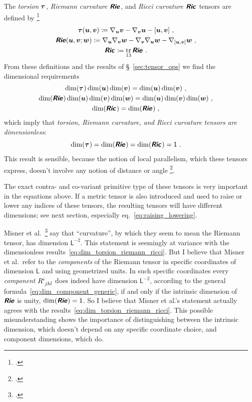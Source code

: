 \documentclass[\ifafour a4paper,12pt,\else a5paper,10pt,\fi%
onecolumn,oneside,article,%
british%
]{memoir}
\makeatletter
\theoremstyle{remark}
\theoremstyle{innote}
\newcommand*{\mathte}[1]{\textbf{\textit{\textsf{#1}}}}
\newcommand*{\citep}{\footcites}
\DeclareMathOperator{\tr}{tr}%
\newcommand*{\defd}{\coloneqq}
\DeclarePairedDelimiter\clcl{[}{]}
\renewcommand*{\|}[1][]{\nonscript\,#1\vert\nonscript\;\mathopen{}}
\newcommand*{\sect}{\S}%
\newcommand*{\eqn}{eq.}%
\newcommand*{\cf}{{cf.}}
\newcommand*{\etal}{{et al.}}
\newcommand*{\q}{}%
\DeclareRobustCommand*{\q}{%
  \mathbin{\mathpalette\bigcdot@{}}%
}
\newcommand*{\bigcdot@scalefactor}{0.7}
\newcommand*{\bigcdot@widthfactor}{1.5}
\newcommand*{\bigcdot@}[2]{%
  \sbox0{$#1\vcenter{}$}%
  \sbox2{$#1\cdot\m@th$}%
  \hbox to \bigcdot@widthfactor\wd2{%
    \hfil
    \raise\ht0\hbox{%
      \scalebox{\bigcdot@scalefactor}{%
        \lower\ht0\hbox{$#1\bullet\m@th$}%
      }%
    }%
    \hfil
  }%
}
\newcommand*{\Un}{\textsf{1}}
\newcommand*{\Le}{\textsf{L}}
\newcommand*{\yR}{\mathte{Rie}}
\newcommand*{\yRi}{\mathte{Ric}}
\newcommand*{\yTo}{\bm{\tau}}
\newcommand*{\yv}{\bm{v}}
\newcommand*{\yu}{\bm{u}}
\newcommand*{\yw}{\bm{w}}
\renewcommand*{\i}{\indices}
\newcommand*{\nab}{\nabla}
\makeatother
\begin{document}
The \emph{torsion} $\yTo\i{^{\q}_{\q\q}}$, \emph{Riemann
  curvature} $\yR\i{^{\q}_{\q\q\q}}$, and \emph{Ricci
  curvature} $\yRi\i{_{\q\q}}$ tensors are defined by
\citep[\sect~V.B.1]{choquetbruhatetal1977_r1996}
\begin{gather}
  \label{eq:torsion_eq}
\yTo(\yu,\yv) \defd \nab_{\yu}\yv - \nab_{\yv}\yu - \clcl{\yu,\yv}\ ,
\\
\yR(\yu,\yv;\yw) \defd
\nab_{\yu}\nab_{\yv}\yw - \nab_{\yv}\nab_{\yu}\yw
- \nab_{\clcl{\yu,\yv}}\yw\ ,
  \label{eq:riemann_eq}  
\\
\yRi\i{_{\q\q}} \defd \tr_{13} \yR\i{^{\q}_{\q\q\q}} \ .
  \label{eq:ricci_eq}  
\end{gather}
From these definitions and the results of \sect~\ref{sec:tensor_ops} we
find the dimensional requirements
\begin{gather}
  \label{eq:torsion_eq_dim}
\dim(\yTo\i{^{\q}_{\q\q}})\dim(\yu)\dim(\yv) = \dim(\yu) \dim(\yv)\ ,
\\
\dim(\yR\i{^{\q}_{\q\q\q}})\dim(\yu)\dim(\yv)\dim(\yw) =
\dim(\yu)\dim(\yv)\dim(\yw)\ ,
\label{eq:riemann_eq_dim}
\\
\dim(\yRi\i{_{\q\q}}) = \dim(\yR\i{^{\q}_{\q\q\q}})\ ,
  \label{eq:ricci_eq_dim}  
\end{gather}
which imply that \emph{torsion, Riemann curvature, and Ricci curvature
  tensors are dimensionless}:
\begin{equation}
  \label{eq:dim_torsion_riemann_ricci}
  \dim(\yTo\i{^{\q}_{\q\q}}) =
   \dim(\yR\i{^{\q}_{\q\q\q}}) =
   \dim(\yRi\i{_{\q\q}}) =\Un\ .
\end{equation}
This result is sensible, because the notion of local parallelism, which
these tensors express, doesn't involve any notion of distance or angle
\citep[\cf][]{portamana2011_r2019}.


The exact contra- and co-variant primitive type of these tensors is very
important in the equations above. If a metric tensor is also introduced and
used to raise or lower any indices of these tensors, the resulting tensors
will have different dimensions; see next section, especially
\eqn~\eqref{eq:raising_lowering}.

Misner \etal\ \citep[p.~35%
]{misneretal1970_r1973} say that \enquote{curvature}, by which they seem to
mean the Riemann tensor, has dimension $\Le^{-2}$. This statement is
seemingly at variance with the dimensionless
results~\eqref{eq:dim_torsion_riemann_ricci}. But I believe that Misner
\etal\ refer to the \emph{components} of the Riemann tensor in specific
coordinates of dimension $\Le$ and using geometrized units. In such
specific coordinates every \emph{component} $R\i{^{i}_{jkl}}$ does indeed
have dimension $\Le^{-2}$, according to the general
formula~\eqref{eq:dim_component_generic}, if and only if the intrinsic
dimension of $\yR$ is unity, $\dim(\yR)=\Un$. So I believe that Misner
\etal's statement actually agrees with the
results~\eqref{eq:dim_torsion_riemann_ricci}. This possible
misunderstanding shows the importance of distinguishing between the
intrinsic dimension, which doesn't depend on any specific coordinate
choice, and component dimensions, which do.
\end{document}

